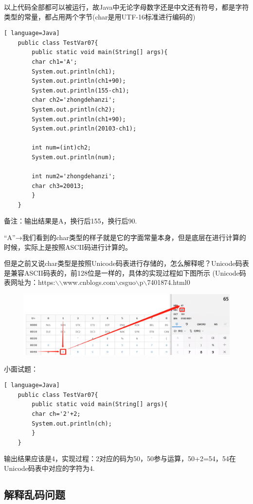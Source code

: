\documentclass{article}
\begin{document}
		\setlength{\parindent}{2em}以上代码全部都可以被运行，故Java中无论字母数字还是中文还有符号，都是字符类型的常量，都占用两个字节(char是用UTF-16标准进行编码的)
	
	\begin{lstlisting}[ language=Java]
	public class TestVar07{
		public static void main(String[] args){
		char ch1='A';
		System.out.println(ch1);
		System.out.println(ch1+90);
		System.out.println(155-ch1);
		char ch2='zhongdehanzi';
		System.out.println(ch2);
		System.out.println(ch1+90);
		System.out.println(20103-ch1);
		
		int num=(int)ch2;
		System.out.println(num);
		
		int num2='zhongdehanzi';
		char ch3=20013;
		}
	}		
	\end{lstlisting}	
	
	备注：输出结果是A，换行后155，换行后90.
	
	\setlength{\parindent}{5em}“A”→我们看到的char类型的样子就是它的字面常量本身，但是底层在进行计算的时候，实际上是按照ASCII码进行计算的。
	
	但是之前又说char类型是按照Unicode码表进行存储的，怎么解释呢？Unicode码表是兼容ASCII码表的，前128位是一样的，具体的实现过程如下图所示
	(Unicode码表网址为：https:$\backslash$$\backslash$www.cnblogs.com$\backslash$csguo$\backslash$p$\backslash$7401874.html0
	
		\begin{figure}[ht]
		\centering
		\includegraphics[width=150mm]{10.png}
	\end{figure}
	
	\setlength{\parindent}{2em}小面试题：
	
	\begin{lstlisting}[ language=Java]
	public class TestVar07{
		public static void main(String[] args){
		char ch='2'+2;
		System.out.println(ch);
		}
	}		
	\end{lstlisting}	
	
	输出结果应该是4，实现过程：2对应的码为50，50参与运算，50+2=54，54在Unicode码表中对应的字符为4.
	
	\subsection{解释乱码问题}
	
\end{document}
